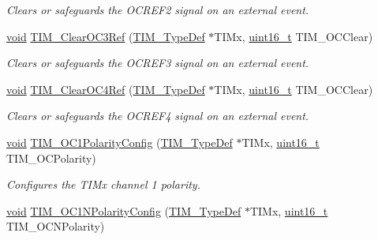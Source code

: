 \begin{DoxyCompactItemize}
\begin{DoxyCompactList}\small\item\em Clears or safeguards the O\+C\+R\+E\+F2 signal on an external event. \end{DoxyCompactList}\item 
\hyperlink{usb__devapi_8h_afabf60e7f57651d6d595a02c75f07cd0}{void} \hyperlink{group___t_i_m___exported___functions_ga0bd9476a14bd346c319945ec4fa2bc67}{T\+I\+M\+\_\+\+Clear\+O\+C3\+Ref} (\hyperlink{struct_t_i_m___type_def}{T\+I\+M\+\_\+\+Type\+Def} $\ast$T\+I\+Mx, \hyperlink{_p_e___types_8h_a1f1825b69244eb3ad2c7165ddc99c956}{uint16\+\_\+t} T\+I\+M\+\_\+\+O\+C\+Clear)
\begin{DoxyCompactList}\small\item\em Clears or safeguards the O\+C\+R\+E\+F3 signal on an external event. \end{DoxyCompactList}\item 
\hyperlink{usb__devapi_8h_afabf60e7f57651d6d595a02c75f07cd0}{void} \hyperlink{group___t_i_m___exported___functions_gaeee5fa66b26e7c6f71850272dc3028f3}{T\+I\+M\+\_\+\+Clear\+O\+C4\+Ref} (\hyperlink{struct_t_i_m___type_def}{T\+I\+M\+\_\+\+Type\+Def} $\ast$T\+I\+Mx, \hyperlink{_p_e___types_8h_a1f1825b69244eb3ad2c7165ddc99c956}{uint16\+\_\+t} T\+I\+M\+\_\+\+O\+C\+Clear)
\begin{DoxyCompactList}\small\item\em Clears or safeguards the O\+C\+R\+E\+F4 signal on an external event. \end{DoxyCompactList}\item 
\hyperlink{usb__devapi_8h_afabf60e7f57651d6d595a02c75f07cd0}{void} \hyperlink{group___t_i_m___exported___functions_ga03878f78163485c8a3508cff2111c297}{T\+I\+M\+\_\+\+O\+C1\+Polarity\+Config} (\hyperlink{struct_t_i_m___type_def}{T\+I\+M\+\_\+\+Type\+Def} $\ast$T\+I\+Mx, \hyperlink{_p_e___types_8h_a1f1825b69244eb3ad2c7165ddc99c956}{uint16\+\_\+t} T\+I\+M\+\_\+\+O\+C\+Polarity)
\begin{DoxyCompactList}\small\item\em Configures the T\+I\+Mx channel 1 polarity. \end{DoxyCompactList}\item 
\hyperlink{usb__devapi_8h_afabf60e7f57651d6d595a02c75f07cd0}{void} \hyperlink{group___t_i_m___exported___functions_ga3cb91578e7dd34ea7d09862482960445}{T\+I\+M\+\_\+\+O\+C1\+N\+Polarity\+Config} (\hyperlink{struct_t_i_m___type_def}{T\+I\+M\+\_\+\+Type\+Def} $\ast$T\+I\+Mx, \hyperlink{_p_e___types_8h_a1f1825b69244eb3ad2c7165ddc99c956}{uint16\+\_\+t} T\+I\+M\+\_\+\+O\+C\+N\+Polarity)

\end{DoxyCompactItemize}
